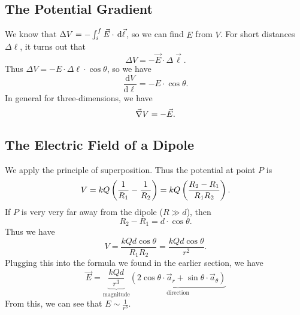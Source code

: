 \documentclass[class=article, crop=false]{standalone}
\begin{document}
  \subsection{The Potential Gradient}
  We know that $\Delta V = -\int_{i}^{f}\vec{E}\cdot  \,\mathrm{d}\vec{\ell}$, so we can find $E$ from $V$. For short distances $\Delta\ell$, it turns out that
  \[
    \Delta V = -\vec{E}\cdot \Delta\vec{\ell}.
  \]
  Thus $\Delta V = -E\cdot \Delta \ell\cdot \cos\theta$, so we have
  \[
    \boxed{\frac{\mathrm{d}V}{\mathrm{d}\ell} = -E\cdot \cos\theta.}
  \]
  In general for three-dimensions, we have
  \[
    \vec{\nabla}V = -\vec{E}.
  \]
  \subsection{The Electric Field of a Dipole}
  We apply the principle of superposition. Thus the potential at point $P$ is 
  \[
    V = kQ \left( \frac{1}{R_1}-\frac{1}{R_2} \right) = kQ \left( \frac{R_2-R_1}{R_1R_2} \right).
  \]
  If $P$ is very very far away from the dipole ($R \gg d$), then
  \[
    R_2 - R_1 = d\cdot \cos\theta.
  \]
  Thus we have
  \[
    V = \frac{kQd\cos\theta}{R_1R_2} = \frac{kQd\cos\theta}{r^2}.
  \]
  Plugging this into the formula we found in the earlier section, we have
  \[
    \vec{E} = \underbrace{\frac{kQd}{r^3}}_{\text{magnitude}}\underbrace{(2\cos\theta\cdot \vec{a}_r+\sin\theta\cdot \vec{a}_\theta)}_{\text{direction}}
  \]
  From this, we can see that $E\sim \frac{1}{r^3}$.
\end{document}
